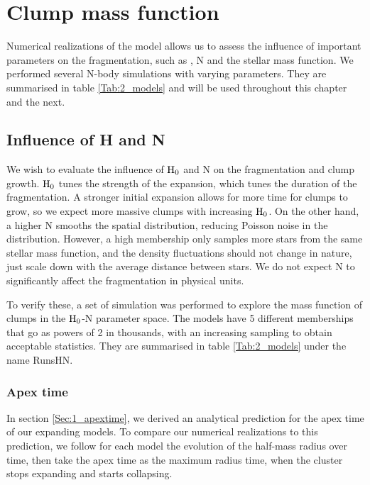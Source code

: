 \section{Clump mass function}

Numerical realizations of the \HubLem model allows us to assess the influence of important parameters on the fragmentation, such as \tHub, N and the stellar mass function. We performed several N-body simulations with varying parameters. They are summarised in table \ref{Tab:2_models} and will be used throughout this chapter and the next.


\subsection{Influence of H and N}

We wish to evaluate the influence of ${\textrm{H}}_0$ and N on the fragmentation and clump growth. ${\textrm{H}}_0$ tunes the strength of the expansion, which tunes the duration of the fragmentation. A stronger initial expansion allows for more time for clumps to grow, so we expect more massive clumps with increasing ${\textrm{H}}_0$. On the other hand, a higher N smooths the spatial distribution, reducing Poisson noise in the  distribution. However, a high membership only samples more stars from the same stellar mass function, and the density fluctuations should not change in nature, just scale down with the average distance between stars.  We do not expect N to significantly affect the fragmentation in physical units. 

To verify these, a set of simulation was performed to explore the mass function of clumps in the ${\textrm{H}}_0$-N parameter space. The models have 5 different memberships that go as powers of 2 in thousands, with an increasing sampling to obtain acceptable statistics. They are summarised in table \ref{Tab:2_models} under the name RunsHN.


\subsubsection*{Apex time}
In section \ref{Sec:1_apextime}, we derived an analytical prediction for the apex time of our expanding models. To compare our numerical realizations to this prediction,  we follow for each model the evolution of the half-mass radius over time, then take the apex time as the maximum radius time, when the cluster stops expanding and starts collapsing. 


